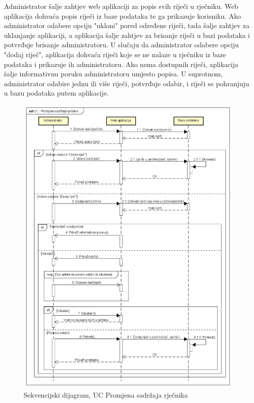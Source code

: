 Administrator šalje zahtjev web aplikaciji za popis svih riječi u rječniku. Web aplikacija dohvaća popis riječi iz baze podataka te ga prikazuje korisniku. Ako administrator odabere opciju "ukloni" pored određene riječi, tada šalje zahtjev za uklanjanje aplikaciji, a aplikacija šalje zahtjev za brisanje riječi u bazi podataka i potvrđuje brisanje administratoru. U slučaju da administrator odabere opciju "dodaj riječ", aplikacija dohvaća riječi koje se ne nalaze u rječniku iz baze podataka i prikazuje ih administratoru. Ako nema dostupnih riječi, aplikacija šalje informativnu poruku administratoru umjesto popisa. U suprotnom, administrator odabire jednu ili više riječi, potvrđuje odabir, i riječi se pohranjuju u bazu podataka putem aplikacije.

\begin{figure}[p]
	\includegraphics[scale=0.55]{dijagrami/UC - Promjena sadrzaja rjecnika.png} 
	\centering
	\caption{Sekvencijski dijagram, UC Promjena sadržaja rječnika}
	\label{fig:uc-promjena-rjecnika}
\end{figure}


